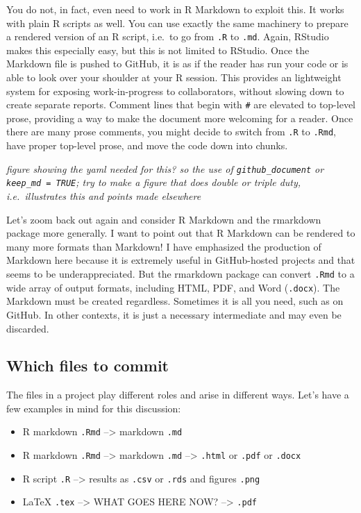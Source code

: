 \documentclass[12pt]{article}
\providecommand{\tightlist}{%
  \setlength{\itemsep}{0pt}\setlength{\parskip}{0pt}}
\begin{document}
You do not, in fact, even need to work in R Markdown to exploit this. It
works with plain R scripts as well. You can use exactly the same
machinery to prepare a rendered version of an R script, i.e.~to go from
\texttt{.R} to \texttt{.md}. Again, RStudio makes this especially easy,
but this is not limited to RStudio. Once the Markdown file is pushed to
GitHub, it is as if the reader has run your code or is able to look over
your shoulder at your R session. This provides an lightweight system for
exposing work-in-progress to collaborators, without slowing down to
create separate reports. Comment lines that begin with
\texttt{\#\textquotesingle{}} are elevated to top-level prose, providing
a way to make the document more welcoming for a reader. Once there are
many prose comments, you might decide to switch from \texttt{.R} to
\texttt{.Rmd}, have proper top-level prose, and move the code down into
chunks.

\emph{figure showing the yaml needed for this? so the use of
\texttt{github\_document} or \texttt{keep\_md\ =\ TRUE}; try to make a
figure that does double or triple duty, i.e.~illustrates this and points
made elsewhere}

Let's zoom back out again and consider R Markdown and the rmarkdown
package more generally. I want to point out that R Markdown can be
rendered to many more formats than Markdown! I have emphasized the
production of Markdown here because it is extremely useful in
GitHub-hosted projects and that seems to be underappreciated. But the
rmarkdown package can convert \texttt{.Rmd} to a wide array of output
formats, including HTML, PDF, and Word (\texttt{.docx}). The Markdown
must be created regardless. Sometimes it is all you need, such as on
GitHub. In other contexts, it is just a necessary intermediate and may
even be discarded.

\subsection{Which files to commit}\label{which-files-to-commit}

The files in a project play different roles and arise in different ways.
Let's have a few examples in mind for this discussion:

\begin{itemize}
\tightlist
\item
  R markdown \texttt{.Rmd} --\textgreater{} markdown \texttt{.md}
\item
  R markdown \texttt{.Rmd} --\textgreater{} markdown \texttt{.md}
  --\textgreater{} \texttt{.html} or \texttt{.pdf} or \texttt{.docx}
\item
  R script \texttt{.R} --\textgreater{} results as \texttt{.csv} or
  \texttt{.rds} and figures \texttt{.png}
\item
  LaTeX \texttt{.tex} --\textgreater{} WHAT GOES HERE NOW?
  --\textgreater{} \texttt{.pdf}
\end{itemize}
\end{document}
